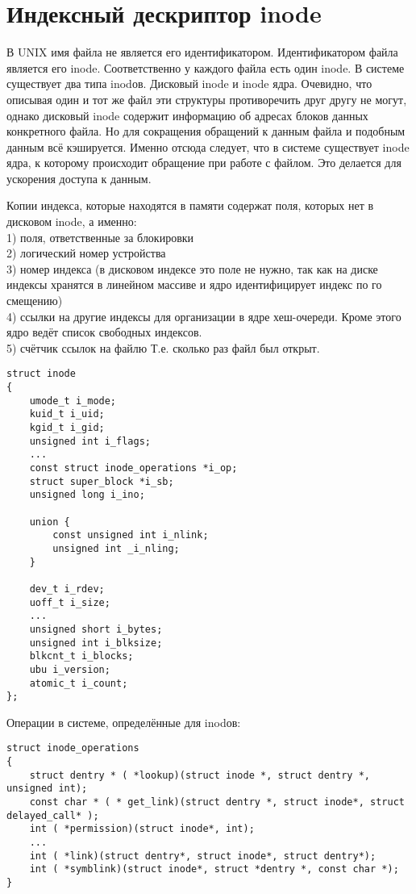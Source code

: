 \section{Индексный дескриптор inode}
В UNIX имя файла не является его идентификатором. Идентификатором файла является его inode. Соответственно у каждого файла есть один inode. В системе существует два типа inodов. Дисковый inode и inode ядра. Очевидно, что описывая один и тот же файл эти структуры противоречить друг другу не могут, однако дисковый inode содержит информацию об адресах блоков данных конкретного файла. Но для сокращения обращений к данным файла и подобным данным всё кэшируется. Именно отсюда следует, что в системе существует inode ядра, к которому происходит обращение при работе с файлом. Это делается для ускорения доступа к данным.

Копии индекса, которые находятся в памяти содержат поля, которых нет в дисковом inode, а именно:\\
1) поля, ответственные за блокировки\\
2) логический номер устройства\\
3) номер индекса (в дисковом индексе это поле не нужно, так как на диске индексы хранятся в линейном массиве и ядро идентифицирует индекс по го смещению)\\
4) ссылки на другие индексы для организации в ядре хеш-очереди. Кроме этого ядро ведёт список свободных индексов.\\
5) счётчик ссылок на файлю Т.е. сколько раз файл был открыт.\\

\begin{lstlisting}
struct inode
{
	umode_t i_mode;
	kuid_t i_uid;
	kgid_t i_gid;
	unsigned int i_flags;
	...
	const struct inode_operations *i_op;
	struct super_block *i_sb;
	unsigned long i_ino;
	
	union {
		const unsigned int i_nlink;
		unsigned int _i_nling;
	}

	dev_t i_rdev;
	uoff_t i_size;
	...
	unsigned short i_bytes;
	unsigned int i_blksize;
	blkcnt_t i_blocks;
	ubu i_version;
	atomic_t i_count;
};
\end{lstlisting}

Операции в системе, определённые для inodов:
\begin{lstlisting}
struct inode_operations
{
	struct dentry * ( *lookup)(struct inode *, struct dentry *, unsigned int);
	const char * ( * get_link)(struct dentry *, struct inode*, struct delayed_call* );
	int ( *permission)(struct inode*, int);
	...
	int ( *link)(struct dentry*, struct inode*, struct dentry*);
	int ( *symblink)(struct inode*, struct *dentry *, const char *); 
}
\end{lstlisting}








